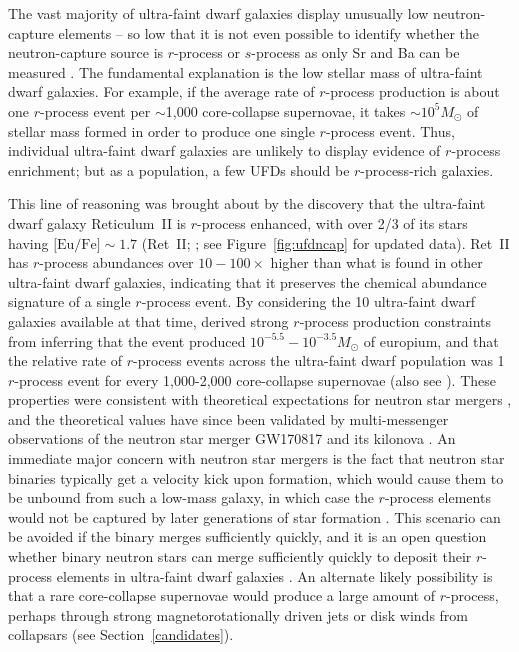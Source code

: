\documentclass[letterpaper]{article}
\begin{document}
The vast majority of ultra-faint dwarf galaxies display unusually low neutron-capture elements -- so low that it is not even possible to identify whether the neutron-capture source is $r$-process or $s$-process as only Sr and Ba can be measured \citep{Frebel2015,Ji2019}.
The fundamental explanation is the low stellar mass of ultra-faint dwarf galaxies. For example, if the average rate of $r$-process production is about one $r$-process event per ${\sim}$1,000 core-collapse supernovae, it takes ${\sim}10^5 M_\odot$ of stellar mass formed in order to produce one single $r$-process event.
Thus, individual ultra-faint dwarf galaxies are unlikely to display evidence of $r$-process enrichment; but as a population, a few UFDs should be $r$-process-rich galaxies.

This line of reasoning was brought about by the discovery that the ultra-faint dwarf galaxy Reticulum~II is $r$-process enhanced, with over 2/3 of its stars having $\mbox{[Eu/Fe]} \sim 1.7$ (Ret~II; \citealt{Ji2016b,Roederer2016}; see Figure~\ref{fig:ufdncap} for updated data). Ret~II has $r$-process abundances over $10-100{\times}$ higher than what is found in other ultra-faint dwarf galaxies, indicating that it preserves the chemical abundance signature of a single $r$-process event. By considering the 10 ultra-faint dwarf galaxies available at that time, \citet{Ji2016b} derived strong $r$-process production constraints from inferring that the event produced $10^{-5.5}-10^{-3.5} M_\odot$ of europium, and that the relative rate of $r$-process events across the ultra-faint dwarf population was 1 $r$-process event for every 1,000-2,000 core-collapse supernovae (also see \citealt{Beniamini2016b}). These properties were consistent with theoretical expectations for neutron star mergers \citep{Goriely11,Dominik12}, and the theoretical values have since been validated by multi-messenger observations of the neutron star merger GW170817 and its kilonova \citep[e.g.,][]{Cote2018}. An immediate major concern with neutron star mergers is the fact that neutron star binaries typically get a velocity kick upon formation, which would cause them to be unbound from such a low-mass galaxy, in which case the $r$-process elements would not be captured by later generations of star formation \citep{Bramante2016,Bonetti2019}. This scenario can be avoided if the binary merges sufficiently quickly, and it is an open question whether binary neutron stars can merge sufficiently quickly to deposit their $r$-process elements in ultra-faint dwarf galaxies \citep{Beniamini2016,Safarzadeh2019}.
% 
An alternate likely possibility is that a rare core-collapse supernovae would produce a large amount of $r$-process, perhaps through strong magnetorotationally driven jets or disk winds from collapsars (see Section~\ref{candidates}).
\end{document}
